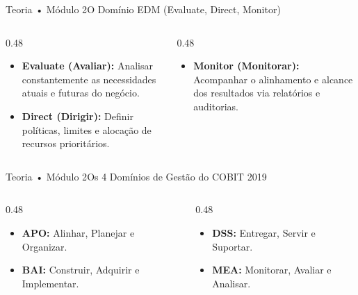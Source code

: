 \begin{senaiframe}{Teoria • Módulo 2}{O Domínio EDM (Evaluate, Direct, Monitor)}
  \begin{columns}[t]
    \begin{column}{0.48\textwidth}
      \begin{tcolorbox}[senaibluecard, title={Avaliar \& Dirigir}]
        \begin{itemize}
          \item \textbf{Evaluate (Avaliar):} Analisar constantemente as necessidades atuais e futuras do negócio.
          \item \textbf{Direct (Dirigir):} Definir políticas, limites e alocação de recursos prioritários.
        \end{itemize}
      \end{tcolorbox}
    \end{column}
    \begin{column}{0.48\textwidth}
      \begin{tcolorbox}[senaiambercard, title={Monitorar}]
        \begin{itemize}
          \item \textbf{Monitor (Monitorar):} Acompanhar o alinhamento e alcance dos resultados via relatórios e auditorias.
        \end{itemize}
      \end{tcolorbox}
    \end{column}
  \end{columns}
\end{senaiframe}

\begin{senaiframe}{Teoria • Módulo 2}{Os 4 Domínios de Gestão do COBIT 2019}
  \begin{columns}[t]
    \begin{column}{0.48\textwidth}
      \begin{tcolorbox}[senaicard, title={Planejamento \& Construção}]
        \begin{itemize}
          \item \textbf{APO:} Alinhar, Planejar e Organizar.
          \item \textbf{BAI:} Construir, Adquirir e Implementar.
        \end{itemize}
      \end{tcolorbox}
    \end{column}
    \begin{column}{0.48\textwidth}
      \begin{tcolorbox}[senaicard, title={Execução \& Avaliação}]
        \begin{itemize}
          \item \textbf{DSS:} Entregar, Servir e Suportar.
          \item \textbf{MEA:} Monitorar, Avaliar e Analisar.
        \end{itemize}
      \end{tcolorbox}
    \end{column}
  \end{columns}
\end{senaiframe}


